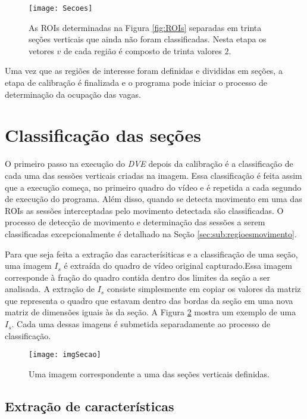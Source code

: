 \begin{figure}
	\centering
	\texttt{[image: Secoes]}
	\caption{As ROIs determinadas na Figura \ref{fig:ROIs} separadas em trinta seções verticais que ainda não foram classificadas. Nesta etapa os vetores $v$ de cada região é composto de trinta valores $2$.}
	\label{fig:secoesVerticais}
	\centering
\end{figure}


Uma vez que as regiões de interesse foram definidas e divididas em seções, a etapa de calibração é finalizada e o programa pode iniciar o processo de determinação da ocupação das vagas. 

\section{Classificação das seções} \label{sec:classificacao}

O primeiro passo na execução do \textit{DVE} depois da calibração é a classificação de cada uma das sessões verticais criadas na imagem. Essa classificação é feita assim que a execução começa, no primeiro quadro do vídeo e é repetida a cada segundo de execução do programa. Além disso, quando se detecta movimento em uma das ROIs as sessões interceptadas pelo movimento detectada são classificadas. O processo de detecção de movimento e determinação das sessões a serem classificadas excepcionalmente é detalhado na Seção \ref{sec:sub:regioesmovimento}.

Para que seja feita a extração das caracterísiticas e a classificação de uma seção, uma imagem $I_s$ é extraída do quadro de vídeo original capturado.Essa imagem corresponde à fração do quadro contida dentro dos limites da seção a ser analisada. A extração de $I_s$ consiste simplesmente em copiar os valores da matriz que representa o quadro que estavam dentro das bordas da seção em uma nova matriz de dimensões iguais às da seção. A Figura \ref{fig:imgSecao} mostra um exemplo de uma $I_s$. Cada uma dessas imagens é submetida separadamente ao processo de classificação.

\begin{figure}
	\centering
	\texttt{[image: imgSecao]}
	\caption{Uma imagem correspondente a uma das seções verticais definidas.}
	\label{fig:imgSecao}
	\centering
\end{figure}


\subsection{Extração de características}\label{sec:extracao}


